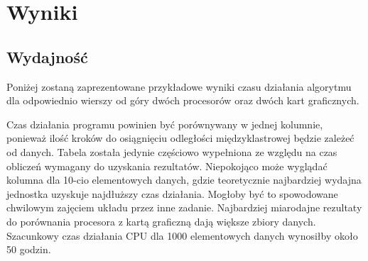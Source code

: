 \chapter{Wyniki}
\label{cha:wyniki}

\section{Wydajność}
\label{sec:wydajnosc}
Poniżej zostaną zaprezentowane przykładowe wyniki czasu działania algorytmu dla odpowiednio wierszy od góry dwóch procesorów oraz dwóch kart graficznych. 
\begin{table}[h]
\caption{Czas obliczeń dla poszczególnych układów dla 4 wymiarowego zbioru danych o n elementach.}
\end{table}
Czas działania programu powinien być porównywany w jednej kolumnie, ponieważ ilość kroków do osiągnięciu odległości międzyklastrowej będzie zależeć od danych.
Tabela została jedynie częściowo wypełniona ze względu na czas obliczeń wymagany do uzyskania rezultatów. Niepokojąco może wyglądać kolumna dla 10-cio elementowych danych, gdzie teoretycznie najbardziej wydajna jednostka uzyskuje najdłuższy czas działania. Mogłoby być to spowodowane chwilowym zajęciem układu przez inne zadanie. Najbardziej miarodajne rezultaty do porównania procesora z kartą graficzną dają większe zbiory danych. Szacunkowy czas działania CPU dla 1000 elementowych danych wynosiłby około 50 godzin.

